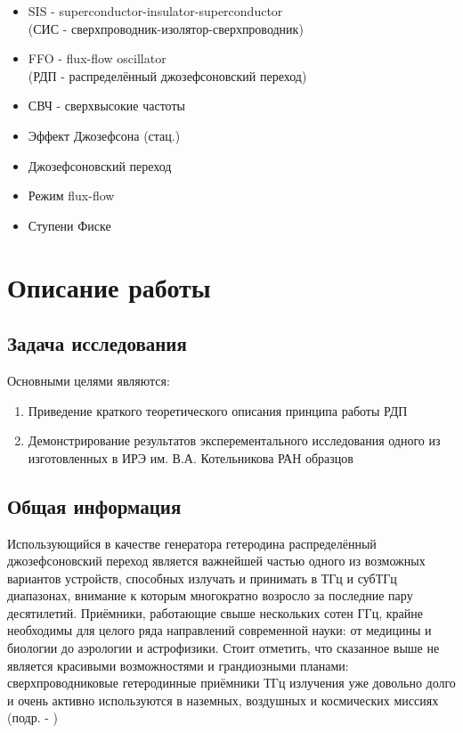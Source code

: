 \documentclass[12pt,a4paper]{article}
\begin{document}
    \begin{itemize}
        \item SIS - superconductor-insulator-superconductor\\ (СИС - сверхпроводник-изолятор-сверхпроводник)
        \item FFO - flux-flow oscillator\\ (РДП - распределённый джозефсоновский переход)
        \item СВЧ - сверхвысокие частоты
        \item Эффект Джозефсона (стац.)
        \item Джозефсоновский переход
        \item Режим flux-flow
        \item Ступени Фиске
    \end{itemize}

\section{Описание работы}

\subsection{Задача исследования}
Основными целями являются:

    \begin{enumerate}
        \item Приведение краткого теоретического описания принципа работы РДП
        \item Демонстрирование результатов эксперементального исследования одного из изготовленных в ИРЭ им. В.А. Котельникова РАН образцов
    \end{enumerate}

\subsection{Общая информация}

Использующийся в качестве генератора гетеродина распределённый джозефсоновский переход является важнейшей частью одного из возможных вариантов устройств, способных излучать и принимать в ТГц и субТГц диапазонах, внимание к которым многократно возросло за последние пару десятилетий. Приёмники, работающие свыше нескольких сотен ГГц, крайне необходимы для целого ряда направлений современной науки: от медицины и биологии до аэрологии и астрофизики. Стоит отметить, что сказанное выше не является красивыми возможностями и грандиозными планами: сверхпроводниковые гетеродинные приёмники ТГц излучения уже довольно долго и очень активно используются в наземных, воздушных и космических миссиях (подр. - \cite{Kinev})
\:
\end{document}
